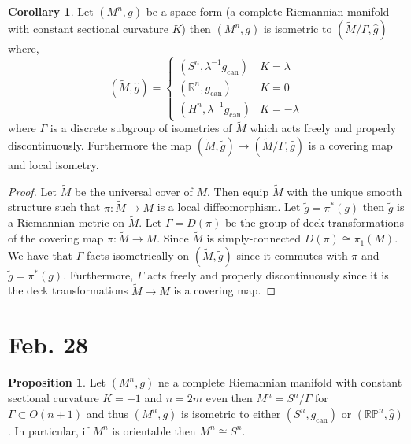 \documentclass[12pt]{extarticle}
\newcommand{\R}{\mathbb{R}}
\theoremstyle{definition}
\newtheorem{proposition}[theorem]{Proposition}
\newtheorem{corollary}[theorem]{Corollary}
\begin{document}
\begin{corollary}
Let $(M^n, g)$ be a space form (a complete Riemannian manifold with constant sectional curvature $K$) then $(M^n, g)$ is isometric to $(\tilde{M} / \Gamma, \hat{g})$ where,
\[ (\tilde{M}, \hat{g}) 
= \begin{cases}
(S^n, \lambda^{-1} g_{\text{can}}) & K = \lambda
\\
(\R^n, g_{\text{can}}) & K = 0
\\
(H^n, \lambda^{-1} g_{\text{can}}) & K = - \lambda
\end{cases} \]
where $\Gamma$ is a discrete subgroup of isometries of $\tilde{M}$ which acts freely and properly discontinuously. Furthermore the map $(\tilde{M}, \tilde{g}) \to (\tilde{M} / \Gamma, \hat{g})$ is a covering map and local isometry. 
\end{corollary}

\begin{proof}
Let $\tilde{M}$ be the universal cover of $M$. Then equip $\tilde{M}$ with the unique smooth structure such that $\pi : \tilde{M} \to M$ is a local diffeomorphism. Let $\tilde{g} = \pi^*(g)$ then $\tilde{g}$ is a Riemannian metric on $\tilde{M}$. Let $\Gamma = D(\pi)$ be the group of deck transformations of the covering map $\pi : \tilde{M} \to M$. Since $\tilde{M}$ is simply-connected $D(\pi) \cong \pi_1(M)$. We have that $\Gamma$ facts isometrically on $(\tilde{M}, \tilde{g})$ since it commutes with $\pi$ and $\tilde{g} = \pi^*(g)$. Furthermore, $\Gamma$ acts freely and properly discontinuously since it is the deck transformations $\tilde{M} \to M$ is a covering map.  
\end{proof}

\section{Feb. 28}

\newcommand{\RP}{\mathbb{RP}}

\begin{proposition}
Let $(M^n, g)$ ne a complete Riemannian manifold with constant sectional curvature $K = +1$ and $n = 2m$ even then $M^n = S^n / \Gamma$ for $\Gamma \subset O(n+1)$ and thus $(M^n, g)$ is isometric to either $(S^n, g_{\text{can}})$ or $(\RP^n, \hat{g})$. In particular, if $M^n$ is orientable then $M^n \cong S^n$. 
\end{proposition}
\end{document}
